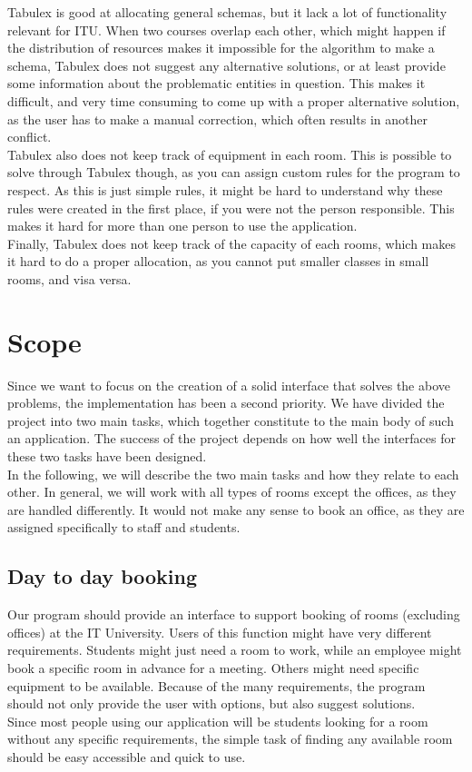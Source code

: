 Tabulex is good at allocating general schemas, but it lack a lot of functionality relevant for ITU. When two courses overlap each other, which might happen if the distribution of resources makes it impossible for the algorithm to make a schema, Tabulex does not suggest any alternative solutions, or at least provide some information about the problematic entities in question. This makes it difficult, and very time consuming to come up with a proper alternative solution, as the user has to make a manual correction, which often results in another conflict. \\
Tabulex also does not keep track of equipment in each room. This is possible to solve through Tabulex though, as you can assign custom rules for the program to respect. As this is just simple rules, it might be hard to understand why these rules were created in the first place, if you were not the person responsible. This makes it hard for more than one person to use the application.\\
Finally, Tabulex does not keep track of the capacity of each rooms, which makes it hard to do a proper allocation, as you cannot put smaller classes in small rooms, and visa versa.

\label{sec:scope}
\section{Scope}
 Since we want to focus on the creation of a solid interface that solves the above problems, the implementation has been a second priority. We have divided the project into two main tasks, which together constitute to the main body of such an application. The success of the project depends on how well the interfaces for these two tasks have been designed.\\
In the following, we will describe the two main tasks and how they relate to each other. In general, we will work with all types of rooms except the offices, as they are handled differently. It would not make any sense to book an office, as they are assigned specifically to staff and students.

\subsection{Day to day booking}
\label{chap1:day_to_day_booking}
Our program should provide an interface to support booking of rooms (excluding offices) at the IT University. Users of this function might have very different requirements. Students might just need a room to work, while an employee might book a specific room in advance for a meeting. Others might need specific equipment to be available. Because of the many requirements, the program should not only provide the user with options, but also suggest solutions.\\
Since most people using our application will be students looking for a room without any specific requirements, the simple task of finding any available room should be easy accessible and quick to use. \\

